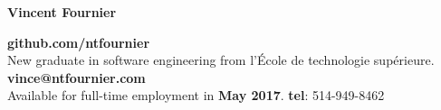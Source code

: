 \documentclass{res}
\newcommand{\inFrench}[1]{}
\newcommand{\inEnglish}[1]{#1}
\begin{document}
\thispagestyle{empty} %

{\bf\huge Vincent Fournier}
\inFrench{
	\hfill \textbf {github.com/ntfournier} \\
	Nouveau diplômé en génie logiciel de l’École de technologie supérieure.
	\hfill \textbf {vince@ntfournier.com} \\
	Disponible pour emploi temps plein à partir de \textbf{mai 2017}.
	\hfill \textbf {Tél.}: 514-949-8462 \\
}
\inEnglish{
	\hfill \textbf {github.com/ntfournier} \\
	New graduate in software engineering from l'École de technologie supérieure.
	\hfill \textbf {vince@ntfournier.com} \\
	Available for full-time employment in \textbf{May 2017}.
	\hfill \textbf {tel}: 514-949-8462 \\
}
\vspace{-15pt}
\end{document}

